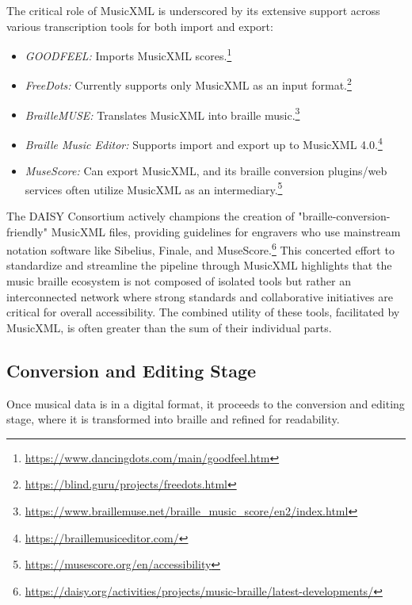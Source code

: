 The critical role of MusicXML is underscored by its extensive support across various transcription tools for both import and export:
\begin{itemize}
    \item \emph{GOODFEEL:} Imports MusicXML scores.\footnote{\url{https://www.dancingdots.com/main/goodfeel.htm}}
    \item \emph{FreeDots:} Currently supports only MusicXML as an input format.\footnote{\url{https://blind.guru/projects/freedots.html}}
    \item \emph{BrailleMUSE:} Translates MusicXML into braille music.\footnote{\url{https://www.braillemuse.net/braille_music_score/en2/index.html}}
    \item \emph{Braille Music Editor:} Supports import and export up to MusicXML 4.0.\footnote{\url{https://braillemusiceditor.com/}}
    \item \emph{MuseScore:} Can export MusicXML, and its braille conversion plugins/web services often utilize MusicXML as an intermediary.\footnote{\url{https://musescore.org/en/accessibility}}
\end{itemize}

The DAISY Consortium actively champions the creation of "braille-conversion-friendly" MusicXML files, providing guidelines for engravers who use mainstream notation software like Sibelius, Finale, and MuseScore.\footnote{\url{https://daisy.org/activities/projects/music-braille/latest-developments/}} This concerted effort to standardize and streamline the pipeline through MusicXML highlights that the music braille ecosystem is not composed of isolated tools but rather an interconnected network where strong standards and collaborative initiatives are critical for overall accessibility. The combined utility of these tools, facilitated by MusicXML, is often greater than the sum of their individual parts.

\subsection{Conversion and Editing Stage}
Once musical data is in a digital format, it proceeds to the conversion and editing stage, where it is transformed into braille and refined for readability.

